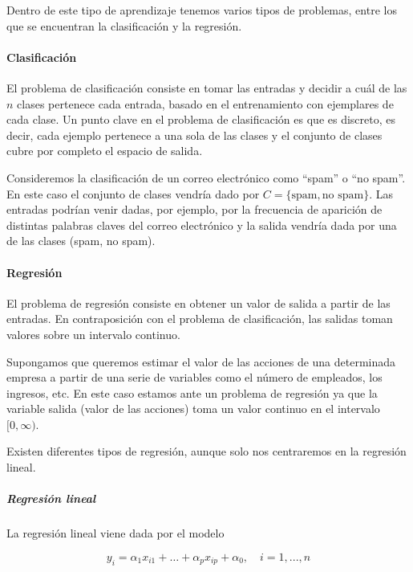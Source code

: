 Dentro de este tipo de aprendizaje tenemos varios tipos de problemas, entre los que se encuentran la clasificación y la regresión.

\paragraph{Clasificación}
El problema de clasificación consiste en tomar las entradas y decidir a cuál de las $n$ clases pertenece cada entrada, basado en el entrenamiento con ejemplares de cada clase. Un punto clave en el problema de clasificación es que es discreto, es decir, cada ejemplo pertenece a una sola de las clases y el conjunto de clases cubre por completo el espacio de salida.

\begin{ejemplo}
Consideremos la clasificación de un correo electrónico como ``spam'' o ``no spam''. En este caso el conjunto de clases vendría dado por $C = \{ \text{spam}, \text{no spam} \}$. Las entradas podrían venir dadas, por ejemplo, por la frecuencia de aparición de distintas palabras claves del correo electrónico y la salida vendría dada por una de las clases (spam, no spam). 
\end{ejemplo}

\paragraph{Regresión}
El problema de regresión consiste en obtener un valor de salida a partir de las entradas. En contraposición con el problema de clasificación, las salidas toman valores sobre un intervalo continuo.

\begin{ejemplo}
Supongamos que queremos estimar el valor de las acciones de una determinada empresa a partir de una serie de variables como el número de empleados, los ingresos, etc. En este caso estamos ante un problema de regresión ya que la variable salida (valor de las acciones) toma un valor continuo en el intervalo $[0,\infty)$.  
\end{ejemplo}

Existen diferentes tipos de regresión, aunque solo nos centraremos en la regresión lineal.

\subparagraph{Regresión lineal}
La regresión lineal viene dada por el modelo~\cite[pág 255]{mathews2004numerical}

\begin{equation}
y_i = \alpha_1 x_{i1} + \dots + \alpha_p x_{ip} + \alpha_0, \quad i = 1,...,n
\end{equation}

